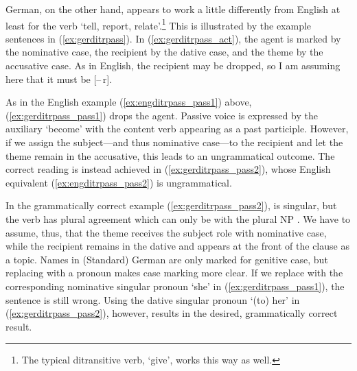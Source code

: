 German, on the other hand, appears to work a little differently from English at
least for the verb  `tell, report, relate'.\footnote{The typical
ditransitive verb,  `give', works this way as well.} This is
illustrated by the example sentences in (\ref{ex:gerditrpass}). In
(\ref{ex:gerditrpass_act}), the agent is marked by the nominative case, the
recipient by the dative case, and the theme by the accusative case. As in
English, the recipient may be dropped, so I am assuming here that it must be
[–\,r].

As in the English example (\ref{ex:engditrpass_pass1}) above,
(\ref{ex:gerditrpass_pass1}) drops the agent. Passive voice is expressed by the
auxiliary  `become' with the content verb appearing as a past
participle. However, if we assign the subject---and thus nominative case---to
the recipient and let the theme remain in the accusative, this leads to an
ungrammatical outcome. The correct reading is instead achieved in
(\ref{ex:gerditrpass_pass2}), whose English equivalent
(\ref{ex:engditrpass_pass2}) is ungrammatical.

In the grammatically correct example (\ref{ex:gerditrpass_pass2}),  is
singular, but the verb  has plural agreement which can only be with
the plural NP . We have to assume, thus, that the theme
receives the subject role with nominative case, while the recipient remains in
the dative and appears at the front of the clause as a topic. Names in
(Standard) German are only marked for genitive case, but replacing 
with a pronoun makes case marking more clear. If we replace  with the
corresponding nominative singular pronoun  `she' in
(\ref{ex:gerditrpass_pass1}), the sentence is still wrong. Using the dative
singular pronoun  `(to) her' in (\ref{ex:gerditrpass_pass2}), however,
results in the desired, grammatically correct result.

